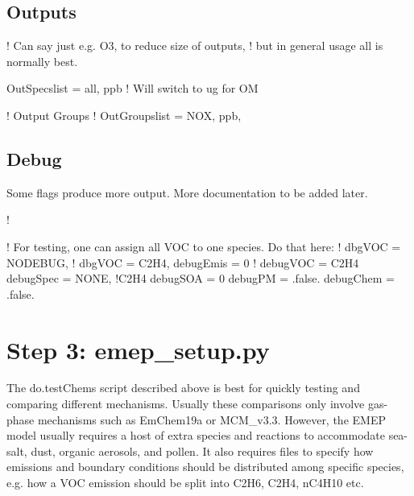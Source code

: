 \documentclass[a4paper,10pt,english]{sphinxmanual}
\begin{document}
\subsection{Outputs}
\label{\detokenize{GenChemDoc_quickstart:outputs}}
\begin{sphinxVerbatim}[commandchars=\\\{\}]
! Can say just e.g. \PYGZsq{}O3\PYGZsq{}, to reduce size of outputs,
!  but in general usage \PYGZsq{}all\PYGZsq{} is normally best.

  OutSpecs\PYGZus{}list =
  \PYGZsq{}all\PYGZsq{}, \PYGZsq{}ppb\PYGZsq{}    ! Will switch to ug for OM

! Output Groups
! \PYGZhy{}\PYGZhy{}\PYGZhy{}\PYGZhy{}\PYGZhy{}\PYGZhy{}\PYGZhy{}\PYGZhy{}\PYGZhy{}\PYGZhy{}\PYGZhy{}\PYGZhy{}\PYGZhy{}\PYGZhy{}
  OutGroups\PYGZus{}list =
  \PYGZsq{}NOX\PYGZsq{},   \PYGZsq{}ppb\PYGZsq{},
\end{sphinxVerbatim}


\subsection{Debug}
\label{\detokenize{GenChemDoc_quickstart:debug}}
Some flags produce more output. More documentation to be added later.

\begin{sphinxVerbatim}[commandchars=\\\{\}]
! \PYGZhy{}\PYGZhy{}\PYGZhy{}\PYGZhy{}\PYGZhy{}

! For testing, one can assign all VOC to one species. Do that here:
!  dbgVOC = \PYGZsq{}NODEBUG\PYGZsq{},
!  dbgVOC = \PYGZsq{}C2H4\PYGZsq{},
  debug\PYGZpc{}Emis = 0
!  debug\PYGZpc{}VOC = \PYGZsq{}C2H4\PYGZsq{}
  debug\PYGZpc{}Spec = \PYGZsq{}NONE\PYGZsq{}, !\PYGZsq{}C2H4\PYGZsq{}
  debug\PYGZpc{}SOA = 0
  debug\PYGZpc{}PM = .false.
  debug\PYGZpc{}Chem = .false.
\end{sphinxVerbatim}


\section{Step 3: emep\_setup.py}
\label{\detokenize{GenChemDoc_quickstart:step-3-emep-setup-py}}
The do.testChems script described above is best for quickly testing and
comparing different mechanisms. Usually these comparisons only involve
gas-phase mechanisms such as EmChem19a or MCM\_v3.3. However, the EMEP
model usually requires a host of extra species and reactions to
accommodate sea-salt, dust, organic aerosols, and pollen.
It also requires files to specify how emissions and boundary
conditions should be distributed among specific species, e.g.
how a VOC emission should be split into C2H6, C2H4, nC4H10 etc.
\end{document}
